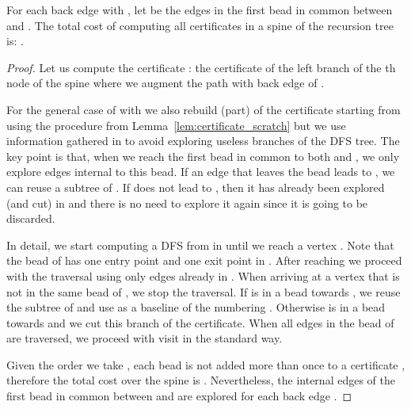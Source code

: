 \begin{lemma}
	For each back edge  with , let 
	be the edges in the first bead in common between 
	and . The total cost of computing all
	certificates  in a spine of the recursion tree is:
	.
	\label{lem:cost-spine-not-amortized}
\end{lemma}
\begin{proof}
	Let us compute the certificate : the certificate
	of the left branch of the th node of the spine where we
	augment the path with back edge  of
	.

	For the general case of  with  we also rebuild
	(part) of the certificate starting from  using the
	procedure from Lemma~\ref{lem:certificate_scratch} but we use
	information gathered in  to avoid exploring useless
	branches of the DFS tree. The key point is that, when we reach
	the first bead in common to both  and
	, we only explore edges internal to this bead.
	If an edge  that leaves the bead leads to , we can reuse
	a subtree of . If  does not lead to , then it
	has already been explored (and cut) in  and there is
	no need to explore it again since it is going to be discarded.

	In detail, we start computing a DFS from  in 
	until we reach a vertex . Note that the
	bead of  has one entry point and one exit point in
	. After reaching  we proceed with the traversal
	using only edges already in . When arriving at a
	vertex  that is not in the same bead of , we stop the
	traversal. If  is in a bead towards , we reuse the
	subtree of  and use  as a baseline of the
	numbering . Otherwise  is in a bead towards
	 and we cut this branch of the certificate. When all
	edges in the bead of  are traversed, we proceed with visit
	in the standard way.

	Given the order we take , each bead is not added more
	than once to a certificate , therefore the total cost
	over the spine is .
	Nevertheless, the internal edges  of the first bead
	in common between  and  are explored
	for each back edge .
\end{proof}

